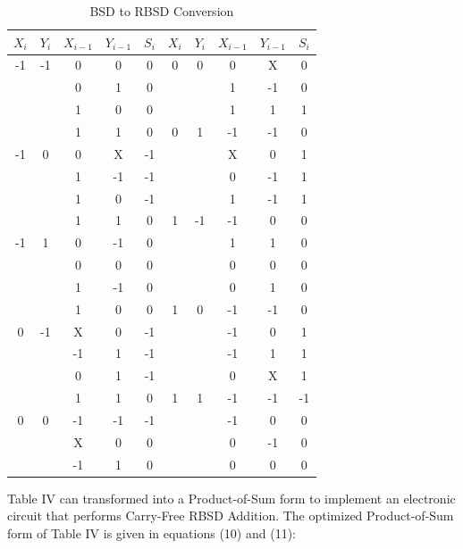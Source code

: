 \documentclass[conference]{IEEEtran}
\begin{document}
\vspace{-.5em}
\begin{table}[h!]
  \centering
  \caption{BSD to RBSD Conversion}
  \label{tab:table4}
  \begin{tabular}{|c|c|c|c||c|||c|c|c|c||c|}
    \hline
    $X_{i}$ & $Y_{i}$ & $X_{i-1}$ & $Y_{i-1}$ & $S_{i}$ & $X_{i}$ & $Y_{i}$ & $X_{i-1}$ & $Y_{i-1}$ & $S_{i}$ \\
    \hline
    \hline
    -1 & -1 & 0 & 0 & 0  &  0 & 0 & 0 & X & 0 \\
    \hline
    & & 0 & 1 & 0  &  & & 1 & -1 & 0 \\
    \hline
    & & 1 & 0 & 0  &  & & 1 & 1 & 1 \\
    \hline
    & & 1 & 1 & 0  &  0 & 1 & -1 & -1 & 0 \\
    \hline
    -1 & 0 & 0 & X & -1  &  & & X & 0 & 1 \\
    \hline
    & & 1 & -1 & -1  &  & & 0 & -1 & 1 \\
    \hline
    & & 1 & 0 & -1  &  & & 1 & -1 & 1 \\
    \hline
    & & 1 & 1 & 0  &  1 & -1 & -1 & 0 & 0 \\
    \hline
    -1 & 1 & 0 & -1 & 0  &  & & 1 & 1 & 0 \\
    \hline
    & & 0 & 0 & 0  &  & & 0 & 0 & 0 \\
    \hline
    & & 1 & -1 & 0 &  & & 0 & 1 & 0 \\
    \hline
    & & 1 & 0 & 0  &  1 & 0 & -1 & -1 & 0 \\
    \hline
    0 & -1 & X & 0 & -1  &  & & -1 & 0 & 1 \\
    \hline
    & & -1 & 1 & -1  &  & & -1 & 1 & 1 \\
    \hline
    & & 0 & 1 & -1  &  & & 0 & X & 1 \\
    \hline
    & & 1 & 1 & 0  &  1 & 1 & -1 & -1 & -1 \\
    \hline
    0 & 0 & -1 & -1 & -1  &  & & -1 & 0 & 0 \\
    \hline
    & & X & 0 & 0  &  & & 0 & -1 & 0 \\
    \hline
    & & -1 & 1 & 0  &  & & 0 & 0 & 0 \\
    \hline
  \end{tabular}
\end{table}

Table IV can transformed into a Product-of-Sum form to implement an electronic circuit that performs Carry-Free RBSD Addition. The optimized Product-of-Sum form of Table IV is given in equations (10) and (11):
\end{document}
